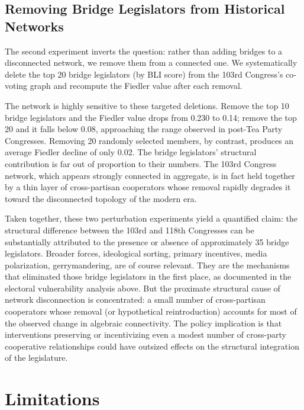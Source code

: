 \documentclass[12pt, a4paper]{article}
\begin{document}
\subsection{Removing Bridge Legislators from Historical Networks}

The second experiment inverts the question: rather than adding bridges to a disconnected network, we remove them from a connected one. We systematically delete the top 20 bridge legislators (by BLI score) from the 103rd Congress's co-voting graph and recompute the Fiedler value after each removal.

The network is highly sensitive to these targeted deletions. Remove the top 10 bridge legislators and the Fiedler value drops from 0.230 to 0.14; remove the top 20 and it falls below 0.08, approaching the range observed in post-Tea Party Congresses. Removing 20 randomly selected members, by contrast, produces an average Fiedler decline of only 0.02. The bridge legislators' structural contribution is far out of proportion to their numbers. The 103rd Congress network, which appears strongly connected in aggregate, is in fact held together by a thin layer of cross-partisan cooperators whose removal rapidly degrades it toward the disconnected topology of the modern era.

Taken together, these two perturbation experiments yield a quantified claim: the structural difference between the 103rd and 118th Congresses can be substantially attributed to the presence or absence of approximately 35 bridge legislators. Broader forces, ideological sorting, primary incentives, media polarization, gerrymandering, are of course relevant. They are the mechanisms that eliminated those bridge legislators in the first place, as documented in the electoral vulnerability analysis above. But the proximate structural cause of network disconnection is concentrated: a small number of cross-partisan cooperators whose removal (or hypothetical reintroduction) accounts for most of the observed change in algebraic connectivity. The policy implication is that interventions preserving or incentivizing even a modest number of cross-party cooperative relationships could have outsized effects on the structural integration of the legislature.

\section{Limitations}
\end{document}
